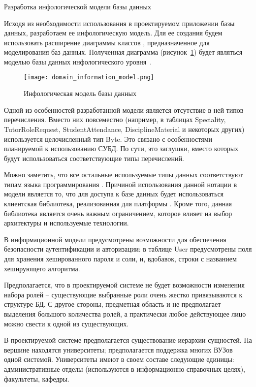 \subsubsection{} Разработка инфологической модели базы данных
\label{sec:domain:model:db}

Исходя из необходимости использования в проектируемом приложении базы данных, разработаем ее инфологическую модель. Для ее создания будем использовать расширение диаграммы классов \uml, предназначенное для моделирования баз данных. Полученная диаграмма (рисунок~\ref{fig:domain:model:db:model}) будет являться моделью базы данных инфологического уровня~\cite{kulikov_db_workbook}.

\begin{figure}
\centering
	\texttt{[image: domain\_information\_model.png]}
	\caption{Инфологическая модель базы данных}
	\label{fig:domain:model:db:model}
\end{figure}

Одной из особенностей разработанной модели является отсутствие в ней типов перечисления. Вместо них повсеместно (например, в таблицах Speciality, TutorRoleRequest, StudentAttendance, DisciplineMaterial и некоторых других) используется целочисленный тип Byte. Это связано с особенностями планируемой к использованию СУБД. По сути, это заглушки, вместо которых будут использоваться соответствующие типы перечислений.

Можно заметить, что все остальные используемые типы данных соответствуют типам языка программирования \csharp. Причиной использования данной нотации в модели является то, что для доступа к базе данных будет использоваться клиентская библиотека, реализованная для платформы \dotnet. Кроме того, данная библиотека является очень важным ограничением, которое влияет на выбор архитектуры и используемые технологии.

В информационной модели предусмотрены возможности для обеспечения безопасности аутентификации и авторизации: в таблице User предусмотрены поля для хранения хешированного пароля и соли, и, вдобавок, строки с названием хеширующего алгоритма.

Предполагается, что в проектируемой системе не будет возможности изменения набора ролей -- существующие выбранные роли очень жестко привязываются к структуре БД. С другое стороны, предметная область и не предполагает выделения большого количества ролей, а практически любое действующее лицо можно свести к одной из существующих.

В проектируемой системе предполагается существование иерархии сущностей. На вершине находятся университеты; предполагается поддержка многих ВУЗов одной системой. Университеты имеют в своем составе следующие единицы: административные отделы (используются в информа\-ционно-справочных целях), факультеты, кафедры.

